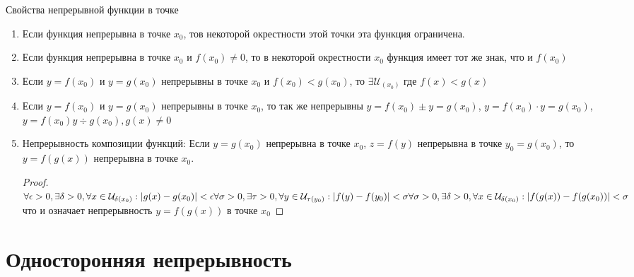 \documentclass[oneside]{book}
\begin{document}
Свойства непрерывной функции в точке
\begin{enumerate}
    \item Если функция непрерывна в точке $x_0$, тов некоторой окрестности этой точки эта функция ограничена.
    \item Если функция непрерывна в точке $x_0$ и $f(x_0) \neq 0$, то в некоторой окрестности $x_0$ функция имеет тот же знак, что и $f(x_0)$
    \item Если $y = f(x_0)$ и $y = g(x_0)$ непрерывны в точке $x_0$ и $f(x_0) < g(x_0)$, то $\exists \mathcal{U}_{(x_0)}$ где $f(x) < g(x)$
    \item Если $y = f(x_0)$ и $y = g(x_0)$ непрерывны в точке $x_0$, то так же непрерывны $y = f(x_0) \pm y = g(x_0)$, $y = f(x_0) \cdot y = g(x_0)$, $y = f(x_0) y \div g(x_0), g(x) \neq 0$
    \item Непрерывность композиции функций: Если $y = g(x_0)$ непрерывна в точке $x_0$, $z = f(y)$ непрерывна в точке $y_0 = g(x_0)$, то
          $y = f(g(x))$ непрерывна в точке $x_0$.
          \begin{proof}
            $ \\
            \forall \epsilon > 0, \exists \delta > 0, \forall x \in \mathcal{U}_{\delta(x_0)}: |g(x) - g(x_0)|<\epsilon \\
            \forall \sigma > 0, \exists \tau > 0, \forall y \in \mathcal{U}_{\tau(y_0)}: |f(y) - f(y_0)|<\sigma \\
            \forall \sigma > 0, \exists \delta > 0, \forall x \in \mathcal{U}_{\delta(x_0)}: |f(g(x)) - f(g(x_0))|<\sigma \\
            $
            что и означает непрерывность $y = f(g(x))$ в точке $x_0$
        \end{proof}
\end{enumerate}

\section[Односторонняя]{Односторонняя непрерывность}
\end{document}
